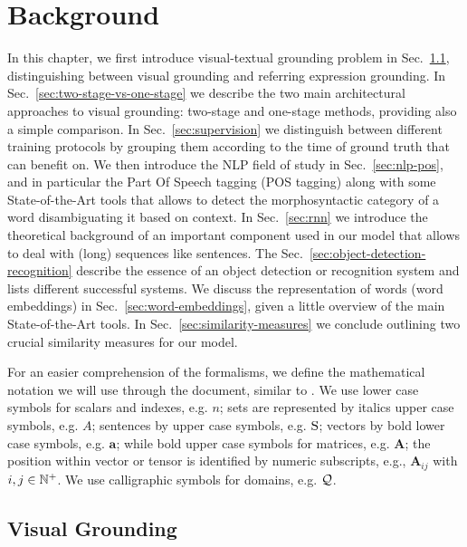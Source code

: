 
\chapter{Background}
\label{ch:background}

In this chapter, we first introduce visual-textual grounding problem
in Sec.~\ref{sec:visual-grounding}, distinguishing between visual
grounding and referring expression grounding. In
Sec.~\ref{sec:two-stage-vs-one-stage} we describe the two main
architectural approaches to visual grounding: two-stage and one-stage
methods, providing also a simple comparison. In
Sec.~\ref{sec:supervision} we distinguish between different training
protocols by grouping them according to the time of ground truth that
can benefit on. We then introduce the NLP field of study in
Sec.~\ref{sec:nlp-pos}, and in particular the Part Of Speech tagging
(POS tagging) along with some State-of-the-Art tools that allows to
detect the morphosyntactic category of a word disambiguating it based
on context. In Sec.~\ref{sec:rnn} we introduce the theoretical
background of an important component used in our model that allows to
deal with (long) sequences like sentences. The
Sec.~\ref{sec:object-detection-recognition} describe the essence of an
object detection or recognition system and lists different successful
systems. We discuss the representation of words (word embeddings) in
Sec.~\ref{sec:word-embeddings}, given a little overview of the main
State-of-the-Art tools. In Sec.~\ref{sec:similarity-measures} we
conclude outlining two crucial similarity measures for our model.

 For an easier comprehension of the formalisms,
we define the mathematical notation we will use through the document,
similar to \cite{rigoni2021better}. We use lower case symbols for
scalars and indexes, e.g. $n$; sets are represented by italics upper
case symbols, e.g. $A$; sentences by upper case symbols, e.g. $\mathrm{S}$;
vectors by bold lower case symbols, e.g. $\bm{a}$; while bold upper
case symbols for matrices, e.g. $\bm{A}$; the position within vector
or tensor is identified by numeric subscripts, e.g., $\bm{A}_{ij}$
with $i, j \in \mathbb{N}^+$. We use calligraphic symbols for domains, e.g.
$\mathcal{Q}$.

\section{Visual Grounding}
\label{sec:visual-grounding}

